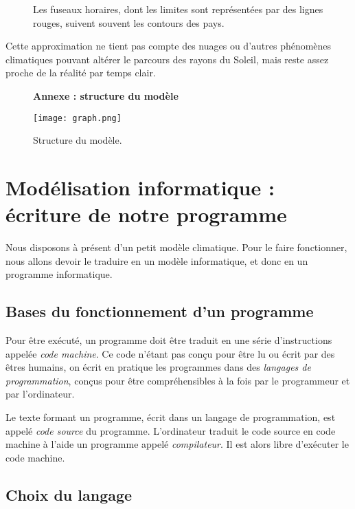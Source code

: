 \documentclass[12pt]{article}
\begin{document}
\begin{figure}[!ht]
  \centering
  \caption{Les fuseaux horaires, dont les limites sont représentées par des lignes rouges, suivent souvent les contours des pays.}
  \label{fig:timezones}
\end{figure}

Cette approximation ne tient pas compte des nuages ou d'autres phénomènes climatiques pouvant altérer le parcours des rayons du Soleil, mais reste assez proche de la réalité par temps clair.

\clearpage
\begin{figure}[!htb]
	\centering
	{ \Large \textbf{Annexe : structure du modèle} \par\medskip }
	\centerline{\texttt{[image: graph.png]}}
	\caption{Structure du modèle.}
	\label{fig:model-structure}
\end{figure}

\clearpage
\section{Modélisation informatique : écriture de notre programme}

Nous disposons à présent d'un petit modèle climatique.
Pour le faire fonctionner, nous allons devoir le traduire en un modèle informatique, et donc en un programme informatique.

\subsection{Bases du fonctionnement d'un programme}

Pour être exécuté, un programme doit être traduit en une série d'instructions appelée \emph{code machine}.
Ce code n'étant pas conçu pour être lu ou écrit par des êtres humains, on écrit en pratique les programmes dans des \emph{langages de programmation}, conçus pour être compréhensibles à la fois par le programmeur et par l'ordinateur.

Le texte formant un programme, écrit dans un langage de programmation, est appelé \emph{code source} du programme.
L'ordinateur traduit le code source en code machine à l'aide un programme appelé \emph{compilateur}.
Il est alors libre d'exécuter le code machine.


\subsection{Choix du langage}
\end{document}

